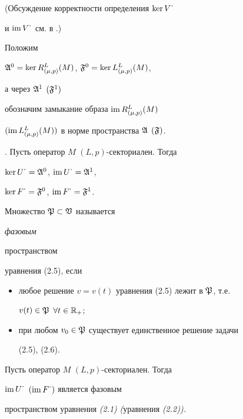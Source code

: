 {\noindent (Обсуждение корректности определения $\ker V^{\textstyle\cdot}$


и $\operatorname{im} V^{\textstyle\cdot}$ см. в \cite{Sv5}.) }


 


Положим 


$\frak A^0=\ker R^L_{(\mu,p)}(M)$, $\frak F^0=\ker L^L_{(\mu,p)}(M)$, 


а через $\frak A^1$ $(\frak F^1)$


обозначим замыкание образа $\operatorname{im} R^L_{(\mu,p)}(M)$ 


$(\operatorname{im} L^L_{(\mu,p)}(M))$ в норме пространства $\frak A$ $(\frak F)$. 


 


\begin{thmm} \cite{Sv5}. Пусть оператор $M$ $(L,p)$-секториален. Тогда 


$\ker U^{\textstyle\cdot}=\frak A^0$, $\operatorname{im} U^{\textstyle\cdot}=\frak A^1$, 


$\ker F^{\textstyle\cdot}=\frak F^0$, $\operatorname{im} F^{\textstyle\cdot}=\frak F^1$. 


\end{thmm} 


 


\begin{defnm} Множество $\frak P\subset\frak V$ называется {\em фазовым 


пространством} уравнения (2.5), если 


\begin{itemize} 


\item[(i)] любое решение $v=v(t)$ уравнения (2.5) лежит в $\frak P$, т.е. 


$v(t)\in \frak P$ $\forall t\in\Bbb R_+$; 


\item[(ii)] при любом $v_0\in\frak P$ существует единственное решение задачи 


(2.5), (2.6). 


\end{itemize} 


\end{defnm} 


 


\begin{thmm} Пусть оператор $M$ $(L,p)$-секториален. Тогда 


$\operatorname{im} U^{\textstyle\cdot}$ $(\operatorname{im} F^{\textstyle\cdot})$ является фазовым 


пространством уравнения {\em (2.1)} {\em (}уравнения {\em (2.2)).} 


\end{thmm} 


